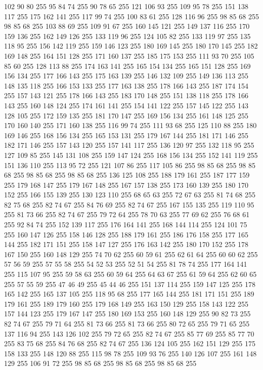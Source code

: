 102 90 80 255 95 84 74 255 90 78 65 255 121 106 93 255 109 95 78 255 151 138 117 255 175 162 141 255 117 99 74 255 100 83 61 255 128 116 96 255 98 85 68 255 98 85 68 255 103 88 69 255 109 91 67 255 160 145 121 255 149 137 116 255 170 159 136 255 162 149 126 255 133 119 96 255 124 105 82 255 133 119 97 255 135 118 95 255 156 142 119 255 159 146 123 255 180 169 145 255 180 170 145 255 182 169 148 255 164 151 128 255 171 160 137 255 185 175 153 255 111 93 70 255 105 85 60 255 128 113 88 255 174 163 141 255 165 154 134 255 165 151 128 255 169 156 134 255 177 166 143 255 175 163 139 255 146 132 109 255 149 136 113 255 148 135 118 255 166 153 133 255 177 163 138 255 178 166 143 255 187 174 154 255 157 143 121 255 178 166 143 255 183 170 148 255 151 138 118 255 178 166 143 255 160 148 124 255 174 161 141 255 154 141 122 255 157 145 122 255 143 128 105 255 172 159 135 255 181 170 147 255 169 156 134 255 161 148 125 255 170 160 140 255 171 160 138 255 116 99 74 255 111 93 68 255
125 110 88 255 180 169 146 255 168 156 134 255 165 153 131 255 179 167 144 255 181 171 146 255 182 171 146 255 157 143 120 255 157 141 117 255 136 120 97 255 132 118 95 255 127 109 85 255 145 131 108 255 159 147 124 255 168 156 134 255 152 141 119 255 151 136 110 255 113 95 72 255 121 107 86 255 117 105 86 255 98 85 68 255 98 85 68 255 98 85 68 255 98 85 68 255 136 125 108 255 188 179 161 255 187 177 159 255 179 168 147 255 179 167 148 255 167 157 138 255 173 160 139 255 180 170 152 255 166 155 139 255 130 123 110 255 68 65 63 255 72 67 63 255 81 74 68 255 82 75 68 255 82 74 67 255 84 76 69 255 82 74 67 255 167 155 135 255 119 110 95 255 81 73 66 255 82 74 67 255 79 72 64 255 78 70 63 255 77 69 62 255 76 68 61 255 92 84 74 255 152 139 117 255 176 164 141 255 168 144 114 255 124 101 75 255 160 147 126 255 158 146 128 255 188 179 161 255 186 176 158 255 177 165 144 255 182 171 151 255 158 147 127 255 176 163 142 255 180 170 152 255 178 167 150 255
160 148 129 255 74 70 62 255 60 59 61 255 62 61 64 255 60 60 62 255 57 56 59 255 57 55 58 255 54 52 53 255 52 51 54 255 81 78 74 255 177 164 141 255 115 107 95 255 59 58 63 255 60 59 64 255 64 63 67 255 61 59 64 255 62 60 65 255 57 55 59 255 47 46 49 255 45 44 46 255 151 137 114 255 159 147 125 255 178 165 142 255 165 137 105 255 118 95 68 255 177 165 144 255 181 171 151 255 189 179 161 255 189 179 160 255 179 168 149 255 163 150 129 255 158 143 122 255 157 144 123 255 179 167 147 255 180 169 153 255 160 148 129 255 90 82 73 255 82 74 67 255 79 71 64 255 81 73 66 255 81 73 66 255 80 72 65 255 79 71 65 255 137 116 94 255 143 126 102 255 79 72 65 255 82 74 67 255 85 77 69 255 85 77 70 255 83 75 68 255 84 76 68 255 82 74 67 255 136 124 105 255 162 151 129 255 175 158 133 255 148 120 88 255 115 98 78 255 109 93 76 255 140 126 107 255 161 148 129 255 106 91 72 255 98 85 68 255 98 85 68 255 98 85 68 255
